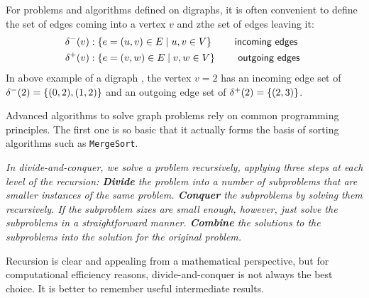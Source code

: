 For problems and algorithms defined on digraphs, it is often convenient to define the set of edges coming into a vertex $v$ and zthe set of edges leaving it:
\begin{align}
\Ein{v}  &: \{ e=(u,v) \in E \; | \; u,v \in V \} \tag*{\eqnameformat{incoming edges}} \\
\Eout{v} &: \{ e=(v,w) \in E \; | \; v,w \in V \} \tag*{\eqnameformat{outgoing edges}}
\end{align}
In above example of a digraph , the vertex $v=2$ has an incoming edge set of $\delta^-(2)=\{(0,2),(1,2)\}$ and an outgoing edge set of $\delta^+(2)=\{(2,3)\}$.

\newpage
Advanced algorithms to solve graph problems rely on common programming principles. The first one is so basic that it actually forms the basis of sorting algorithms such as \texttt{MergeSort}.
\begin{definition}
\textit{In divide-and-conquer, we solve a problem recursively, applying three steps at each level of the recursion:
\textbf{Divide} the problem into a number of subproblems that are smaller instances of the same problem. 
\textbf{Conquer} the subproblems by solving them recursively. If the subproblem sizes are small enough, however, just solve the subproblems in a straightforward manner. 
\textbf{Combine} the solutions to the subproblems into the solution for the original problem.} \cite[ch. 4]{cormen2009introduction}
\end{definition}

Recursion is clear and appealing from a mathematical perspective, but for computational efficiency reasons, divide-and-conquer is not always the best choice. It is better to remember useful intermediate results.

